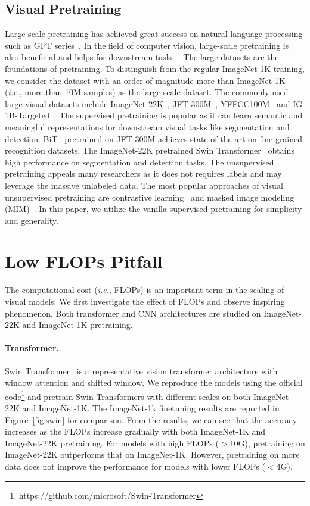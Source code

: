 \documentclass{article}
\newcommand{\ie}{\emph{i.e.}}
\begin{document}
\subsection{Visual Pretraining}
Large-scale pretraining has achieved great success on natural language processing such as GPT series~\cite{gpt3,gpt4}. In the field of computer vision, large-scale pretraining is also beneficial and helps for downstream tasks~\cite{bit,swin,sam}.
The large datasets are the foundations of pretraining. To distinguish from the regular ImageNet-1K training, we consider the dataset with an order of magnitude more than ImageNet-1K (\ie, more than 10M samples) as the large-scale dataset. The commonly-used large visual datasets include ImageNet-22K~\cite{imagenet}, JFT-300M~\cite{sun2017revisiting}, YFFCC100M~\cite{yfcc100m} and IG-1B-Targeted~\cite{yalniz2019billion}.
The supervised pretraining is popular as it can learn semantic and meaningful representations for downstream visual tasks like segmentation and detection. BiT~\cite{bit} pretrained on JFT-300M achieves state-of-the-art on fine-grained recognition datasets. The ImageNet-22K pretrained Swin Transformer~\cite{swin} obtains high performance on segmentation and detection tasks.
The unsupervised pretraining appeals many researchers as it does not requires labels and may leverage the massive unlabeled data. The most popular approaches of visual unsupervised pretraining are contrastive learning~\cite{he2020momentum,simclr} and masked image modeling (MIM)~\cite{bao2021beit,he2022masked,xie2022simmim}.
In this paper, we utilize the vanilla supervised pretraining for simplicity and generality.

\section{Low FLOPs Pitfall}
The computational cost (\ie, FLOPs) is an important term in the scaling of visual models. We first investigate the effect of FLOPs and observe inspiring phenomenon. Both transformer and CNN architectures are studied on ImageNet-22K and ImageNet-1K pretraining.

\paragraph{Transformer.}
Swin Transformer~\cite{swin} is a representative vision transformer architecture with window attention and shifted window. We reproduce the models using the official code\footnote{https://github.com/microsoft/Swin-Transformer} and pretrain Swin Transformers with different scales on both ImageNet-22K and ImageNet-1K. The ImageNet-1k finetuning results are reported in Figure~\ref{fig:swin} for comparison. From the results, we can see that the accuracy increases as the FLOPs increase gradually with both ImageNet-1K and ImageNet-22K pretraining. For models with high FLOPs ($>$10G), pretraining on ImageNet-22K outperforms that on ImageNet-1K. However, pretraining on more data does not improve the performance for models with lower FLOPs ($<$4G).
\end{document}
